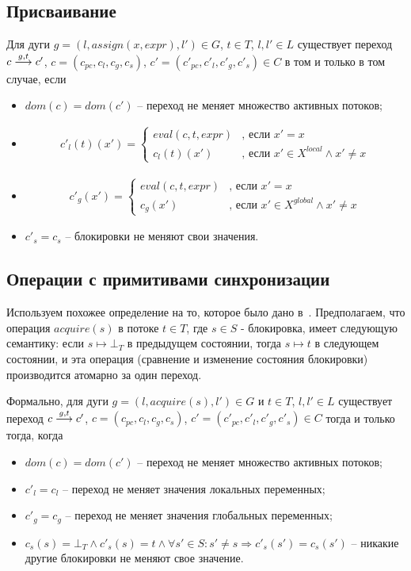 \subsection{Присваивание}
Для дуги $g = (l, assign(x, expr), l') \in G$, $t\in T$, $l, l' \in L$ существует переход $c \stackrel{g, t}{\longrightarrow} c'$, $c=(c_{pc}, c_l, c_g, c_s)$, $c'=(c'_{pc}, c'_l, c'_g, c'_s) \in C$ в том и только в том случае, если
\begin{itemize}
\item $dom(c)=dom(c')$ -- переход не меняет множество активных потоков;
\item 
\begin{align}
c'_l(t)(x')=
\begin{cases}
eval(c, t, expr)& \text{, если $x' = x$} \\
c_l(t)(x') & \text{, если $x' \in X^{local} \land x'\neq x$}
\end{cases} \nonumber
\end{align}
\item
\begin{align}
c'_g(x')=
\begin{cases}
eval(c, t, expr)& \text{, если $x' = x$} \\
c_g(x') & \text{, если $x' \in X^{global} \land x'\neq x$}
\end{cases} \nonumber
\end{align}
\item $c'_s = c_s$ -- блокировки не меняют свои значения.
\end{itemize}

\subsection{Операции с примитивами синхронизации}
Используем похожее определение на то, которое было дано в~\cite{TAR}. 
Предполагаем, что операция $acquire(s)$ в потоке $t \in T$, где $s\in S$ - блокировка, имеет следующую семантику: 
если $s \mapsto \bot_T$ в предыдущем состоянии, тогда $s \mapsto t$ в следующем состоянии, и эта операция (сравнение и изменение состояния блокировки) производится атомарно за один переход.

Формально, для дуги $g = (l, acquire(s), l') \in G$ и $t\in T$, $l, l' \in L$ существует переход
$c \stackrel{g, t}{\longrightarrow} c'$, $c=(c_{pc}, c_l, c_g, c_s)$, $c'=(c'_{pc}, c'_l, c'_g, c'_s) \in C$
тогда и только тогда, когда 
\begin{itemize}
\item $dom(c)=dom(c')$ -- переход не меняет множество активных потоков;
\item $c'_l=c_l$ -- переход не меняет значения локальных переменных;
\item $c'_g = c_g$ -- переход не меняет значения глобальных переменных;
\item $c_s(s) = \bot_T \land c'_s(s)=t \land \forall s'\in S: s'\neq s \Rightarrow c'_s(s')=c_s(s')$ -- никакие другие блокировки не меняют свое значение.
\end{itemize}


